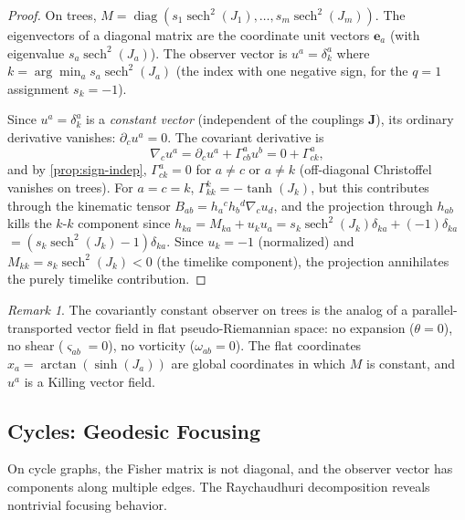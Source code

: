\documentclass[11pt]{article}
\theoremstyle{definition}
\theoremstyle{remark}
\newtheorem{remark}[theorem]{Remark}
\newcommand{\Met}{M}
\newcommand{\obs}{u}
\newcommand{\vort}{\omega}
\newcommand{\coupl}{\mathbf{J}}
\newcommand{\Chr}[2]{\Gamma^{#1}_{#2}}
\newcommand{\diag}{\operatorname{diag}}
\newcommand{\sech}{\operatorname{sech}}
\newcommand{\expan}{\theta}
\newcommand{\shear}{\varsigma} %
\begin{document}
\begin{proof}
On trees, $\Met = \diag(s_1 \sech^2(J_1), \ldots, s_m \sech^2(J_m))$.
The eigenvectors of a diagonal matrix are the coordinate unit vectors
$\mathbf{e}_a$ (with eigenvalue $s_a \sech^2(J_a)$). The observer vector
is $\obs^a = \delta^a_{k}$ where $k = \arg\min_a s_a \sech^2(J_a)$
(the index with one negative sign, for the $q = 1$ assignment $s_k = -1$).

Since $\obs^a = \delta^a_k$ is a \emph{constant vector} (independent of
the couplings $\coupl$), its ordinary derivative vanishes:
$\partial_c \obs^a = 0$. The covariant derivative is
\[
  \nabla_c \obs^a = \partial_c \obs^a + \Chr{a}{cb} \obs^b
    = 0 + \Chr{a}{ck},
\]
and by \cref{prop:sign-indep}, $\Chr{a}{ck} = 0$ for $a \neq c$ or
$a \neq k$ (off-diagonal Christoffel vanishes on trees). For $a = c = k$,
$\Chr{k}{kk} = -\tanh(J_k)$, but this contributes through the kinematic
tensor $B_{ab} = h_a{}^c h_b{}^d \nabla_c \obs_d$, and the projection
through $h_{ab}$ kills the $k$-$k$ component since $h_{ka} = \Met_{ka}
+ \obs_k \obs_a = s_k \sech^2(J_k) \delta_{ka} + (-1)\delta_{ka}$
$= (s_k \sech^2(J_k) - 1)\delta_{ka}$. Since $\obs_k = -1$ (normalized)
and $\Met_{kk} = s_k \sech^2(J_k) < 0$ (the timelike component),
the projection annihilates the purely timelike contribution.
\end{proof}

\begin{remark}
The covariantly constant observer on trees is the analog of
a parallel-transported vector field in flat pseudo-Riemannian space:
no expansion ($\expan = 0$), no shear ($\shear_{ab} = 0$),
no vorticity ($\vort_{ab} = 0$).
The flat coordinates $x_a = \arctan(\sinh(J_a))$ are global
coordinates in which $\Met$ is constant, and $\obs^a$ is a Killing
vector field.
\end{remark}

\subsection{Cycles: Geodesic Focusing}
\label{subsec:cycle-focusing}

On cycle graphs, the Fisher matrix is not diagonal, and the observer
vector has components along multiple edges. The Raychaudhuri decomposition
reveals nontrivial focusing behavior.
\end{document}
